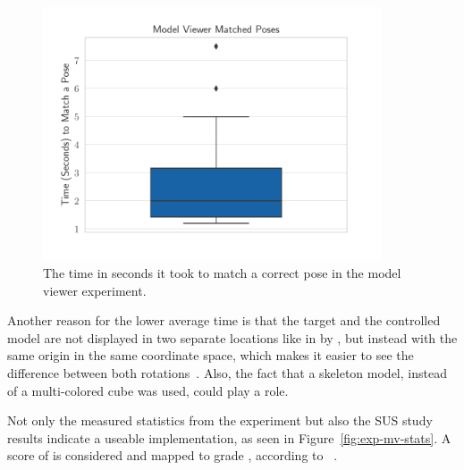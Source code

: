\begin{figure}[H]
	\centering
	\includegraphics[width=10cm]{figures/evaluation/eval_exp_mv.pdf}
	\caption[Model viewer task results]{The time in seconds it took to match a correct pose in the model viewer experiment.}\label{fig:eval-exp-mv}
\end{figure}

Another reason for the lower average time is that the target and the controlled model are not displayed in two separate locations like in {} by \citeauthor{Katzakis.2010}, but instead with the same origin in the same coordinate space, which makes it easier to see the difference between both rotations~\cite[140]{Katzakis.2010}. Also, the fact that a skeleton model, instead of a multi-colored cube was used, could play a role.

Not only the measured statistics from the experiment but also the \gls{SUS} study results indicate a useable implementation, as seen in Figure~\ref{fig:exp-mv-stats}. A score of \evalExpMvSusScore{} is considered \evalExpMvSusAdj{} and mapped to grade \evalExpMvSusGrade, according to \citeauthor{Bangor.2009}~\cite[120\psq]{Bangor.2009}.

